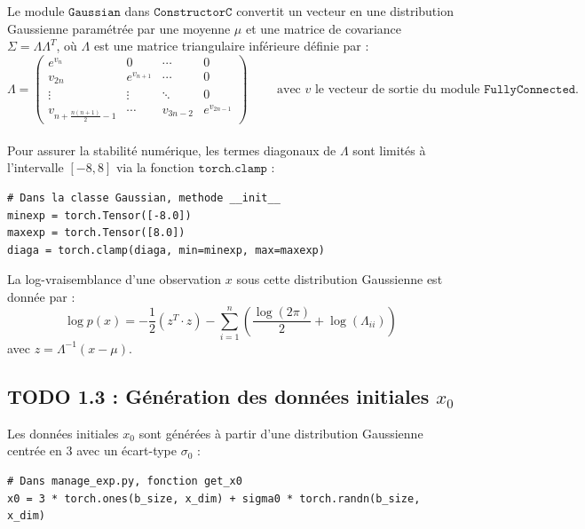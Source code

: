 \documentclass[12pt,a4paper]{article}
\begin{document}
Le module $\texttt{Gaussian}$ dans $\texttt{ConstructorC}$ convertit un vecteur en une distribution Gaussienne paramétrée par une moyenne $\mu$ et une matrice de covariance $\Sigma = \Lambda \Lambda^T$, où $\Lambda$ est une matrice triangulaire inférieure définie par :
$$
\Lambda = \begin{pmatrix}
    e^{v_n} & 0 & \cdots & 0 \\
    v_{2n} & e^{v_{n+1}} & \cdots & 0 \\
    \vdots & \vdots & \ddots & 0 \\
    v_{n+\frac{n(n+1)}{2}-1} & \cdots & v_{3n-2} & e^{v_{2n-1}}
\end{pmatrix}  \qquad \text{ avec } v \text{ le vecteur de sortie du module } \texttt{FullyConnected}.
$$\\

Pour assurer la stabilité numérique, les termes diagonaux de $\Lambda$ sont limités à l'intervalle $[-8, 8]$ via la fonction $\texttt{torch.clamp}$ : \\

\begin{lstlisting}
# Dans la classe Gaussian, methode __init__
minexp = torch.Tensor([-8.0])
maxexp = torch.Tensor([8.0])
diaga = torch.clamp(diaga, min=minexp, max=maxexp)
\end{lstlisting}

\vspace{0.5cm}

La log-vraisemblance d'une observation $x$ sous cette distribution Gaussienne est donnée par :
\begin{equation}
    \log p(x) = -\frac{1}{2} (z^T \cdot z) - \sum_{i=1}^{n} \left( \frac{\log(2\pi)}{2} + \log(\Lambda_{ii}) \right)
\end{equation}
avec $z = \Lambda^{-1} (x - \mu)$. \\

\vspace{0.5cm}

\subsection*{TODO 1.3 : Génération des données initiales $x_0$}

Les données initiales $x_0$ sont générées à partir d'une distribution Gaussienne centrée en 3 avec un écart-type $\sigma_0$ : \\

\begin{lstlisting}
# Dans manage_exp.py, fonction get_x0
x0 = 3 * torch.ones(b_size, x_dim) + sigma0 * torch.randn(b_size, x_dim)
\end{lstlisting}
\end{document}
